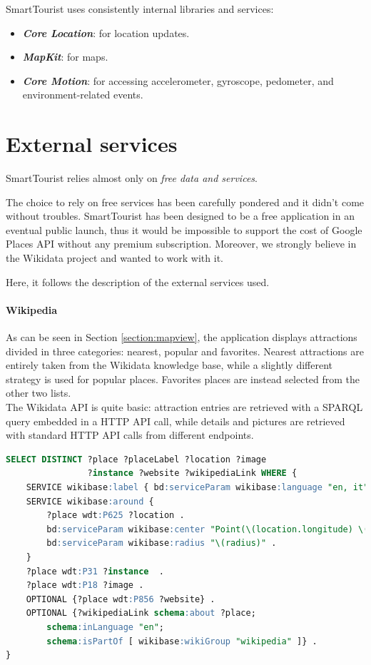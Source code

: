 \documentclass[a4paper, 11pt, parskip=half]{scrreprt}
\theoremstyle{definition}
\newenvironment{info}[1][Info:]{ %
	\medskip
	\begin{mdframed}[style=info]
		\noindent{\textbf{#1}}
}{
	\end{mdframed}
}
\begin{document}
SmartTourist uses consistently internal libraries and services:

\begin{itemize}
    \item \textbf{\textit{Core Location}}: for location updates.
	\item \textbf{\textit{MapKit}}: for maps.
	\item \textbf{\textit{Core Motion}}: for accessing accelerometer, gyroscope, pedometer, and environment-related events.
\end{itemize}

\section{External services}

SmartTourist relies almost only on \textit{free data and services}. 

\begin{info}
The choice to rely on free services has been carefully pondered and it didn't come without troubles. SmartTourist has been designed to be a free application in an eventual public launch, thus it would be impossible to support the cost of Google Places API without any premium subscription. Moreover, we strongly believe in the Wikidata project and wanted to work with it.
\end{info}

Here, it follows the description of the external services used.

\paragraph{Wikipedia}
As can be seen in Section \ref{section:mapview}, the application displays attractions divided in three categories: nearest, popular and favorites. Nearest attractions are entirely taken from the Wikidata knowledge base, while a slightly different strategy is used for popular places. Favorites places are instead selected from the other two lists. \\
The Wikidata API is quite basic: attraction entries are retrieved with a SPARQL query embedded in a HTTP API call, while details and pictures are retrieved with standard HTTP API calls from different endpoints.
		
\begin{lstlisting}[language=sql, caption={SPARQL query for attractions retrieving.}, captionpos=b]
SELECT DISTINCT ?place ?placeLabel ?location ?image 
                ?instance ?website ?wikipediaLink WHERE {
    SERVICE wikibase:label { bd:serviceParam wikibase:language "en, it" }
    SERVICE wikibase:around {
        ?place wdt:P625 ?location .
        bd:serviceParam wikibase:center "Point(\(location.longitude) \(location.latitude))"^^geo:wktLiteral .
        bd:serviceParam wikibase:radius "\(radius)" .
    }
    ?place wdt:P31 ?instance  .
    ?place wdt:P18 ?image .
    OPTIONAL {?place wdt:P856 ?website} .
    OPTIONAL {?wikipediaLink schema:about ?place;
        schema:inLanguage "en";
        schema:isPartOf [ wikibase:wikiGroup "wikipedia" ]} .
}
\end{lstlisting}
		
\end{document}
